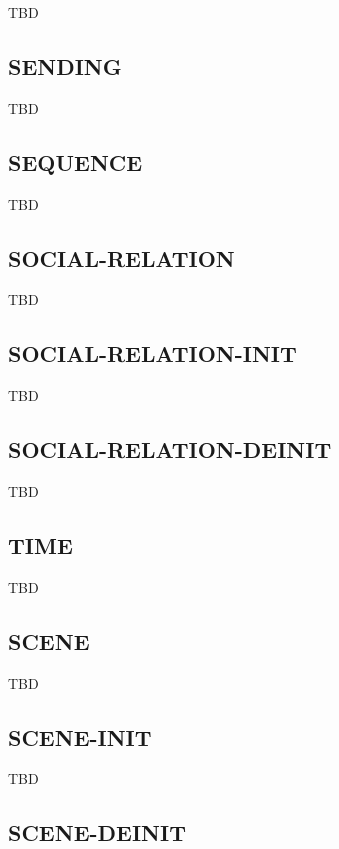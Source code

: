 \documentclass[a4paper]{article}
\newcommand{\fr}[1]{\textsf{#1}}
\begin{document}
TBD

\subsection{\fr{SENDING}}
\label{sec:SENDING}

TBD

\subsection{\fr{SEQUENCE}}
\label{sec:SEQUENCE}

TBD

\subsection{\fr{SOCIAL-RELATION}}
\label{sec:SOCIAL-RELATION}

TBD

\subsection{\fr{SOCIAL-RELATION-INIT}}
\label{sec:SOCIAL-RELATION-INIT}

TBD

\subsection{\fr{SOCIAL-RELATION-DEINIT}}
\label{sec:SOCIAL-RELATION-DEINIT}

TBD

\subsection{\fr{TIME}}
\label{sec:TIME}

TBD

\subsection{\fr{SCENE}}
\label{sec:SCENE}

TBD

\subsection{\fr{SCENE-INIT}}
\label{sec:SCENE-INIT}

TBD

\subsection{\fr{SCENE-DEINIT}}
\label{sec:SCENE-DEINIT}
\end{document}
